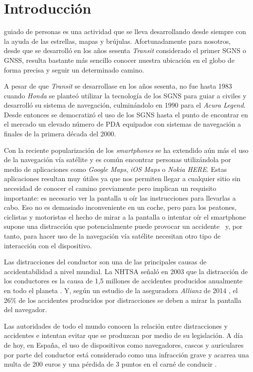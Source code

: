 \chapter{Introducción}
\label{chap:intro}

 guiado de personas es una actividad que se lleva desarrollando desde siempre con la
ayuda de las estrellas, mapas y brújulas. Afortunadamente para nosotros, desde que se desarrolló en
los años sesenta \emph{Transit} considerado el primer \acf{SGNS} o \acf{GNSS}, resulta bastante
más sencillo conocer nuestra ubicación en el globo de forma precisa y seguir un determinado camino.

A pesar de que \emph{Transit} se desarrollase en los años sesenta, no fue hasta 1983 cuando
\emph{Honda} se planteó utilizar la tecnología de los \acs{SGNS} para guiar a civiles y desarrolló
su sistema de navegación, culminándolo en 1990 para el \emph{Acura Legend}. Desde entonces se
democratizó el uso de los \acs{SGNS} hasta el punto de encontrar en el mercado un elevado número de
\acf{PDA} equipados con sistemas de navegación a finales de la primera década del 2000.

Con la reciente popularización de los \emph{smartphones} se ha extendido aún más el uso de la
navegación vía satélite y es común encontrar personas utilizándola por medio de aplicaciones como
\emph{Google Maps}, \emph{iOS Maps} o \emph{Nokia HERE}. Estas aplicaciones resultan muy útiles ya
que nos permiten llegar a cualquier sitio sin necesidad de conocer el camino previamente pero
implican un requisito importante: es necesario ver la pantalla u oír las instrucciones para
llevarlas a cabo. Eso no es demasiado inconveniente en un coche, pero para los peatones, ciclistas y
motoristas el hecho de mirar a la pantalla o intentar oír el smartphone supone una distracción que
potencialmente puede provocar un accidente~\cite{Valcarcel12} y, por tanto, para hacer uso de la
navegación vía satélite necesitan otro tipo de interacción con el dispositivo.

Las distracciones del conductor son una de las principales causas de accidentabilidad a nivel
mundial. La \acf{NHTSA} señaló en 2003 que la distracción de los conductores es la causa de 1,5
millones de accidentes producidos anualmente en todo el planeta \cite{RACC03}. Y, según un estudio
de la aseguradora \emph{Allianz} de 2014 \cite{Allianz14}, el 26\% de los accidentes producidos por
distracciones se deben a mirar la pantalla del navegador.

Las autoridades de todo el mundo conocen la relación entre distracciones y accidentes e intentan
evitar que se produzcan por medio de su legislación. A día de hoy, en España, el uso de dispositivos
como navegadores, cascos y auriculares por parte del conductor está considerado como una infracción
grave y acarrea una multa de 200 euros y una pérdida de 3 puntos en el carné de conducir
\cite{Serrano14} .

